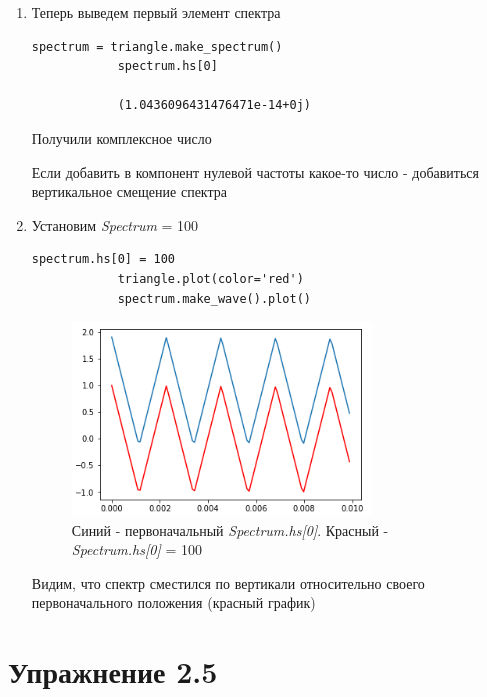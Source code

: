 \documentclass[a4paper,12pt]{article}
\begin{document}
\begin{enumerate}
\begin{enumerate}
		\item Теперь выведем первый элемент спектра
		\begin{lstlisting}[caption=Первый элемент спектра]
			spectrum = triangle.make_spectrum()
			spectrum.hs[0]
			
			(1.0436096431476471e-14+0j)
		\end{lstlisting}	
	
		Получили комплексное число
		
		Если добавить в компонент нулевой частоты какое-то число - добавиться вертикальное смещение спектра
		
		\item Установим \textit{Spectrum} = 100
		\begin{lstlisting}[caption=Первый элемент спектра]
			spectrum.hs[0] = 100
			triangle.plot(color='red')
			spectrum.make_wave().plot()
		\end{lstlisting}
		\begin{figure}[H]
			\centering
			\includegraphics[width=0.75\textwidth]{4_2.png}
			\caption{Синий - первоначальный \textit{Spectrum.hs[0]}. Красный - \textit{Spectrum.hs[0]} = 100}
			\label{fig:4.2}
		\end{figure}
		Видим, что спектр сместился по вертикали относительно своего первоначального положения (красный график)
		
	\end{enumerate}
	
\end{enumerate}

\newpage

\section{Упражнение 2.5}
\end{document}
